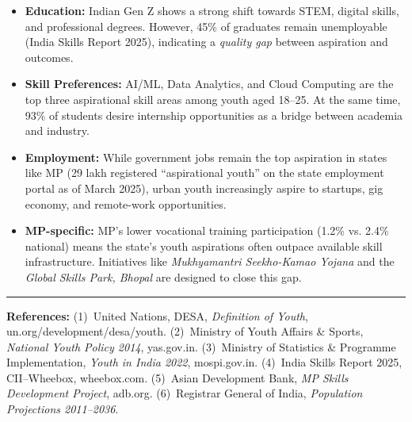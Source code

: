 \documentclass[11pt,a4paper]{article}
\begin{document}
\begin{itemize}
  \item \textbf{Education:} Indian Gen Z shows a strong shift towards STEM, digital skills, and professional degrees. However, 45\% of graduates remain unemployable (India Skills Report 2025), indicating a \textit{quality gap} between aspiration and outcomes.
  \item \textbf{Skill Preferences:} AI/ML, Data Analytics, and Cloud Computing are the top three aspirational skill areas among youth aged 18--25. At the same time, 93\% of students desire internship opportunities as a bridge between academia and industry.
  \item \textbf{Employment:} While government jobs remain the top aspiration in states like MP (29 lakh registered ``aspirational youth'' on the state employment portal as of March 2025), urban youth increasingly aspire to startups, gig economy, and remote-work opportunities.
  \item \textbf{MP-specific:} MP's lower vocational training participation (1.2\% vs. 2.4\% national) means the state's youth aspirations often outpace available skill infrastructure. Initiatives like \textit{Mukhyamantri Seekho-Kamao Yojana} and the \textit{Global Skills Park, Bhopal} are designed to close this gap.
\end{itemize}

\vspace{0.25cm}
\noindent\rule{\textwidth}{0.5pt}
{\scriptsize\textbf{References:}
(1)~United Nations, DESA, \textit{Definition of Youth}, un.org/development/desa/youth.
(2)~Ministry of Youth Affairs \& Sports, \textit{National Youth Policy 2014}, yas.gov.in.
(3)~Ministry of Statistics \& Programme Implementation, \textit{Youth in India 2022}, mospi.gov.in.
(4)~India Skills Report 2025, CII--Wheebox, wheebox.com.
(5)~Asian Development Bank, \textit{MP Skills Development Project}, adb.org.
(6)~Registrar General of India, \textit{Population Projections 2011--2036}.
}
\end{document}
